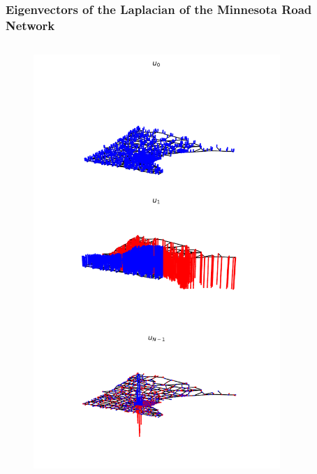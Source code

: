\documentclass{beamer}
\begin{document}
\begin{frame}
  \frametitle{Eigenvectors of the Laplacian of the Minnesota Road Network}
  \begin{columns}
    \begin{column}{0.5\textwidth}
\begin{figure}
\includegraphics[trim={0 10cm 0 0},clip,width=\linewidth]{../img/graph_fourier_transform_5.pdf}
\end{figure}
  \end{column}
    \begin{column}{0.5\textwidth}
\begin{figure}

\end{figure}
\end{column}
\end{columns}
\end{frame}
\end{document}
